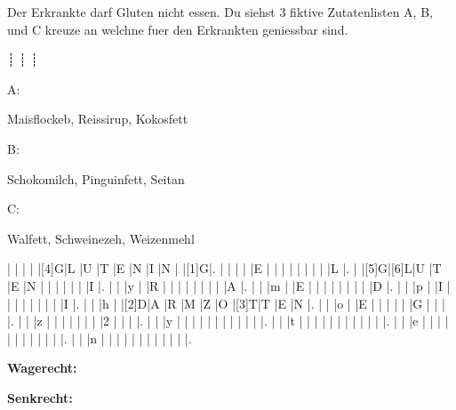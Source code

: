 \documentclass[11pt,twoside,a4paper]{exam}
\begin{document}
\begin{questions}
  \question Der Erkrankte darf Gluten nicht essen. Du siehst 3 fiktive Zutatenlisten A, B, und C kreuze an welchne fuer den Erkrankten geniessbar sind.
     \begin{oneparcheckboxes}
     ┊ 
     ┊ 
  ┊    
     \end{oneparcheckboxes}


\begin{minipage}[t]{0.3\textwidth}
 A:

 Maisflockeb, Reissirup, Kokosfett
\end{minipage}
\begin{minipage}[t]{0.3\textwidth}
 B: 

 Schokomilch, Pinguinfett, Seitan
\end{minipage}
\begin{minipage}[t]{0.3\textwidth}
 C:

 Walfett, Schweinezeh, Weizenmehl
\end{minipage}


\vspace{0.4in}
\begin{Puzzle}{15}{15}
  |{}  |{}  |{}  |{}  |[4]G|L   |U   |T   |E   |N   |I   |N   |{}  |[1]G|.
  |{}  |{}  |{}  |{}  |E   |{}  |{}  |{}  |{}  |{}  |{}  |{}  |{}  |L   |.
  |{}  |[5]G|[6]L|U   |T   |E   |N   |{}  |{}  |{}  |{}  |{}  |{}  |I   |.
  |{}  |{}  |y   |{}  |R   |{}  |{}  |{}  |{}  |{}  |{}  |{}  |{}  |A   |.
  |{}  |{}  |m   |{}  |E   |{}  |{}  |{}  |{}  |{}  |{}  |{}  |{}  |D   |.
  |{}  |{}  |p   |{}  |I   |{}  |{}  |{}  |{}  |{}  |{}  |{}  |{}  |I   |.
  |{}  |{}  |h   |{}  |[2]D|A   |R   |M   |Z   |O   |[3]T|T   |E   |N   |.
  |{}  |{}  |o   |{}  |E   |{}  |{}  |{}  |{}  |{}  |G   |{}  |{}  |{}  |.
  |{}  |{}  |z   |{}  |{}  |{}  |{}  |{}  |{}  |{}  |2   |{}  |{}  |{}  |.
  |{}  |{}  |y   |{}  |{}  |{}  |{}  |{}  |{}  |{}  |{}  |{}  |{}  |{}  |.
  |{}  |{}  |t   |{}  |{}  |{}  |{}  |{}  |{}  |{}  |{}  |{}  |{}  |{}  |.
  |{}  |{}  |e   |{}  |{}  |{}  |{}  |{}  |{}  |{}  |{}  |{}  |{}  |{}  |.
  |{}  |{}  |n   |{}  |{}  |{}  |{}  |{}  |{}  |{}  |{}  |{}  |{}  |{}  |.
\end{Puzzle}
\begin{PuzzleClues}{\textbf{Wagerecht:}}
\end{PuzzleClues}
\begin{PuzzleClues}{\textbf{Senkrecht:}}
\end{PuzzleClues}
\end{questions}
\end{document}
